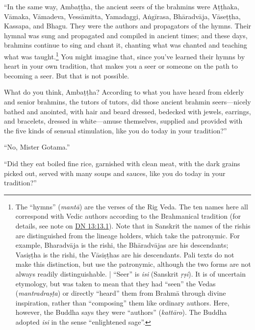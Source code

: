 \documentclass[12pt,openany]{book}%
\begin{document}
“In the same way, \textsanskrit{Ambaṭṭha}, the ancient seers of the brahmins were \textsanskrit{Aṭṭhaka}, \textsanskrit{Vāmaka}, \textsanskrit{Vāmadeva}, \textsanskrit{Vessāmitta}, Yamadaggi, \textsanskrit{Aṅgīrasa}, \textsanskrit{Bhāradvāja}, \textsanskrit{Vāseṭṭha}, Kassapa, and Bhagu. They were the authors and propagators of the hymns. Their hymnal was sung and propagated and compiled in ancient times; and these days, brahmins continue to sing and chant it, chanting what was chanted and teaching what was taught.\footnote{The “hymns” (\textit{\textsanskrit{mantā}}) are the verses of the Rig Veda. The ten names here all correspond with Vedic authors according to the Brahmanical tradition (for details, see note on \href{https://suttacentral.net/dn13/en/sujato\#13.1}{DN 13:13.1}). Note that in Sanskrit the names of the rishis are distinguished from the lineage holders, which take the patronymic. For example, \textsanskrit{Bharadvāja} is the rishi, the \textsanskrit{Bhāradvājas} are his descendants; \textsanskrit{Vasiṣṭha} is the rishi, the \textsanskrit{Vāsiṣṭhas} are his descendants. Pali texts do not make this distinction, but use the patronymic, although the two forms are not always readily distinguishable. | “Seer” is \textit{isi} (Sanskrit \textit{\textsanskrit{ṛṣi}}). It is of uncertain etymology, but was taken to mean that they had “seen” the Vedas (\textit{\textsanskrit{mantradraṣṭa}}) or directly “heard” them from \textsanskrit{Brahmā} through divine inspiration, rather than “composing” them like ordinary authors. Here, however, the Buddha says they were “authors” (\textit{\textsanskrit{kattāro}}). The Buddha adopted \textit{isi} in the sense “enlightened sage”. } You might imagine that, since you’ve learned their hymns by heart in your own tradition, that makes you a seer or someone on the path to becoming a seer. But that is not possible. 

What do you think, \textsanskrit{Ambaṭṭha}? According to what you have heard from elderly and senior brahmins, the tutors of tutors, did those ancient brahmin seers—nicely bathed and anointed, with hair and beard dressed, bedecked with jewels, earrings, and bracelets, dressed in white—amuse themselves, supplied and provided with the five kinds of sensual stimulation, like you do today in your tradition?” 

“No, Mister Gotama.” 

“Did they eat boiled fine rice, garnished with clean meat, with the dark grains picked out, served with many soups and sauces, like you do today in your tradition?” 
\end{document}
